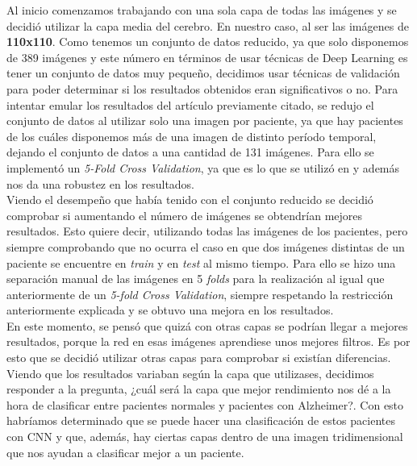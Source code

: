 Al inicio comenzamos trabajando con una sola capa de todas las imágenes y se decidió utilizar la capa media del cerebro. En nuestro caso, al ser las imágenes de \textbf{110x110}. Como tenemos un conjunto de datos reducido, ya que solo disponemos de 389 imágenes y este número en términos de usar técnicas de Deep Learning es tener un conjunto de datos muy pequeño, decidimos usar técnicas de validación para poder determinar si los resultados obtenidos eran significativos o no. Para intentar emular los resultados del artículo \cite{residualVGG} previamente citado, se redujo el conjunto de datos al utilizar solo una imagen por paciente, ya que hay pacientes de los cuáles disponemos más de una imagen de distinto período temporal, dejando el conjunto de datos a una cantidad de 131 imágenes. Para ello se implementó un \textit{5-Fold Cross Validation}, ya que es lo que se utilizó en \cite{residualVGG} y además nos da una robustez en los resultados.\\

Viendo el desempeño que había tenido con el conjunto reducido se decidió comprobar si aumentando el número de imágenes se obtendrían mejores resultados. Esto quiere decir, utilizando todas las imágenes de los pacientes, pero siempre comprobando que no ocurra el caso en que dos imágenes distintas de un paciente se encuentre en \textit{train} y en \textit{test} al mismo tiempo. Para ello se hizo una separación manual de las imágenes en 5 \textit{folds} para la realización al igual que anteriormente de un \textit{5-fold Cross Validation}, siempre respetando la restricción anteriormente explicada y se obtuvo una mejora en los resultados.\\

En este momento, se pensó que quizá con otras capas se podrían llegar a mejores resultados, porque la red en esas imágenes aprendiese unos mejores filtros. Es por esto que se decidió utilizar otras capas para comprobar si existían diferencias.\\

Viendo que los resultados variaban según la capa que utilizases, decidimos responder a la pregunta, ¿cuál será la capa que mejor rendimiento nos dé a la hora de clasificar entre pacientes normales y pacientes con Alzheimer?. Con esto habríamos determinado que se puede hacer una clasificación de estos pacientes con CNN y que, además, hay ciertas capas dentro de una imagen tridimensional que nos ayudan a clasificar mejor a un paciente.\\

